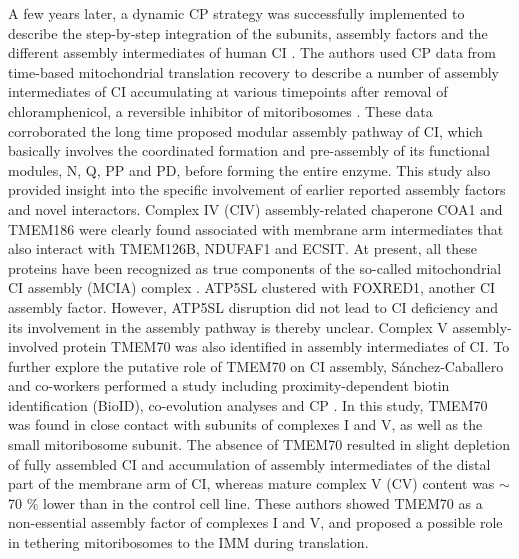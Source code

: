 A few years later, a dynamic CP strategy was successfully implemented to describe the step-by-step integration of the subunits, assembly factors and the different assembly intermediates of human CI \cite{Guerrero-Castillo_2017a}. The authors used CP data from time-based mitochondrial translation recovery to describe a number of assembly intermediates of CI accumulating at various timepoints after removal of chloramphenicol, a reversible inhibitor of mitoribosomes \cite{Ugalde_2004}. These data corroborated the long time proposed modular assembly pathway of CI, which basically involves the coordinated formation and pre-assembly of its functional modules, N, Q, PP and PD, before forming the entire enzyme. This study also provided insight into the specific involvement of earlier reported assembly factors and novel interactors. Complex IV (CIV) assembly-related chaperone COA1 and TMEM186 were clearly found associated with membrane arm intermediates that also interact with TMEM126B, NDUFAF1 and ECSIT. At present, all these proteins have been recognized as true components of the so-called mitochondrial CI assembly (MCIA) complex \cite{Formosa_2020}. ATP5SL clustered with FOXRED1, another CI assembly factor. However, ATP5SL disruption did not lead to CI deficiency \cite{Andrews_2013} and its involvement in the assembly pathway is thereby unclear. Complex V assembly-involved protein TMEM70 was also identified in assembly intermediates of CI. To further explore the putative role of TMEM70 on CI assembly, Sánchez-Caballero and co-workers performed a study including proximity-dependent biotin identification (BioID), co-evolution analyses and CP \cite{Sanchez-Caballero_2020}. In this study, TMEM70 was found in close contact with subunits of complexes I and V, as well as the small mitoribosome subunit. The absence of TMEM70 resulted in slight depletion of fully assembled CI and accumulation of assembly intermediates of the distal part of the membrane arm of CI, whereas mature complex V (CV) content was $\sim$70 \% lower than in the control cell line. These authors showed TMEM70 as a non-essential assembly factor of complexes I and V, and proposed a possible role in tethering mitoribosomes to the IMM during translation.
